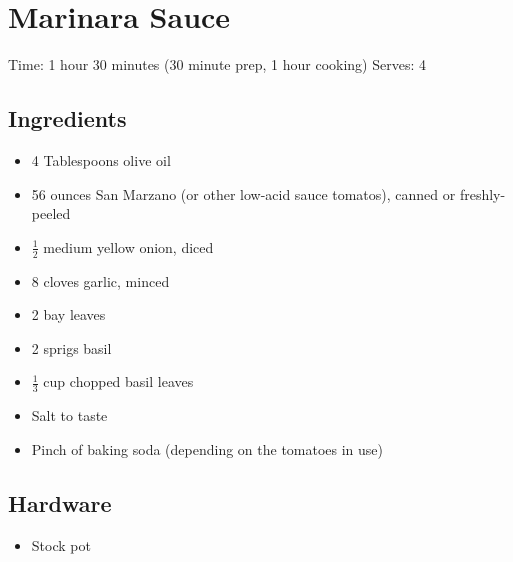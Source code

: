 \section{Marinara Sauce}
\label{marinaraSauce}
\setcounter{secnumdepth}{0}
Time: 1 hour 30 minutes (30 minute prep, 1 hour cooking)
Serves: 4

\begin{multicols}{2}
\subsection*{Ingredients}
\begin{itemize}
    \item 4 Tablespoons olive oil
    \item 56 ounces San Marzano (or other low-acid sauce tomatos), canned or freshly-peeled
    \item \( \frac{1}{2} \) medium yellow onion, diced
    \item 8 cloves garlic, minced
    \item 2 bay leaves
    \item 2 sprigs basil
    \item \( \frac{1}{3} \) cup chopped basil leaves
    \item Salt to taste
    \item Pinch of baking soda (depending on the tomatoes in use)
\end{itemize}

\subsection*{Hardware}
\begin{itemize}
    \item Stock pot
\end{itemize}
\clearpage


\end{multicols}
